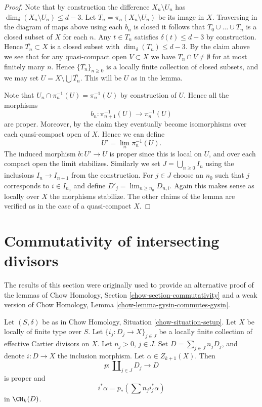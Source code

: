 \begin{proof}
\medskip\noindent
Note that by construction the difference $X_n \setminus U_n$
has $\dim_\delta(X_n \setminus U_n) \leq d - 3$.
Let $T_n = \pi_n(X_n \setminus U_n)$ be its image in $X$.
Traversing in the diagram of maps above using each $b_n$ is closed
it follows that $T_0 \cup \ldots \cup T_n$ is a closed subset of $X$
for each $n$. Any $t \in T_n$ satisfies $\delta(t) \leq d - 3$
by construction. Hence $\overline{T_n} \subset X$ is a closed subset
with $\dim_\delta(T_n) \leq d - 3$. By the claim above we see
that for any quasi-compact open $V \subset X$ we have
$T_n \cap V \not = \emptyset$ for at most finitely many $n$.
Hence $\{\overline{T_n}\}_{n \geq 0}$ is a locally finite
collection of closed subsets, and we may set
$U = X \setminus \bigcup \overline{T_n}$. This will be
$U$ as in the lemma.

\medskip\noindent
Note that $U_n \cap \pi_n^{-1}(U) = \pi_n^{-1}(U)$ by construction
of $U$. Hence all the morphisms
$$
b_n : \pi_{n + 1}^{-1}(U) \longrightarrow \pi_n^{-1}(U)
$$
are proper. Moreover, by the claim they eventually become isomorphisms
over each quasi-compact open of $X$. Hence we can define
$$
U' = \lim_n \pi_n^{-1}(U).
$$
The induced morphism $b : U' \to U$ is proper since this is local
on $U$, and over each compact open the limit stabilizes. Similarly
we set $J = \bigcup_{n \geq 0} I_n$ using the inclusions
$I_n \to I_{n + 1}$ from the construction. For $j \in J$ choose
an $n_0$ such that $j$ corresponds to $i \in I_{n_0}$ and define
$D'_j = \lim_{n \geq n_0} D_{n, i}$. Again this makes sense
as locally over $X$ the morphisms stabilize.
The other claims of the lemma are verified as in the case
of a quasi-compact $X$.
\end{proof}









\section{Commutativity of intersecting divisors}
\label{section-commutativity}

\noindent
The results of this section were originally used to provide an alternative
proof of the lemmas of Chow Homology, Section \ref{chow-section-commutativity}
and a weak version of
Chow Homology, Lemma \ref{chow-lemma-gysin-commutes-gysin}.

\begin{lemma}
\label{lemma-improved-additivity}
Let $(S, \delta)$ be as in Chow Homology, Situation \ref{chow-situation-setup}.
Let $X$ be locally of finite type over $S$.
Let $\{i_j : D_j \to X \}_{j \in J}$ be a locally finite collection
of effective Cartier divisors on $X$. Let $n_j > 0$, $j\in J$.
Set $D = \sum_{j \in J} n_j D_j$, and denote $i : D \to X$ the
inclusion morphism. Let $\alpha \in Z_{k + 1}(X)$. Then
$$
p : \coprod\nolimits_{j \in J} D_j \longrightarrow D
$$
is proper and
$$
i^*\alpha = p_*\left(\sum n_j i_j^*\alpha\right)
$$
in $\CH_k(D)$.
\end{lemma}

